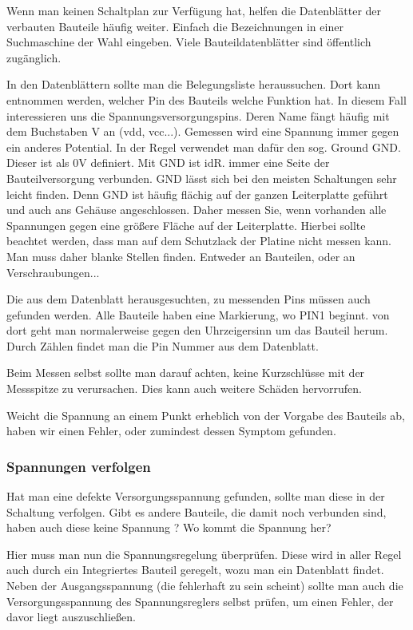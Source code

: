 Wenn man keinen Schaltplan zur Verfügung hat, helfen die Datenblätter der verbauten Bauteile häufig weiter.
Einfach die Bezeichnungen in einer Suchmaschine der Wahl eingeben.
Viele Bauteildatenblätter sind öffentlich zugänglich.

In den Datenblättern sollte man die Belegungsliste heraussuchen.
Dort kann entnommen werden, welcher Pin des Bauteils welche Funktion hat.
In diesem Fall interessieren uns die Spannungsversorgungspins.
Deren Name fängt häufig mit dem Buchstaben V an (vdd, vcc...). Gemessen wird eine Spannung immer gegen ein anderes Potential. In der Regel verwendet man dafür den sog. Ground GND.
Dieser ist als 0V definiert. Mit GND ist idR. immer eine Seite der Bauteilversorgung verbunden.
GND lässt sich bei den meisten Schaltungen sehr leicht finden. Denn GND ist häufig flächig auf der ganzen Leiterplatte geführt und auch ans Gehäuse angeschlossen.
Daher messen Sie, wenn vorhanden alle Spannungen gegen eine größere Fläche auf der Leiterplatte.
Hierbei sollte beachtet werden, dass man auf dem Schutzlack der Platine nicht messen kann.
Man muss daher blanke Stellen finden. Entweder an Bauteilen, oder an Verschraubungen...

Die aus dem Datenblatt herausgesuchten, zu messenden Pins müssen auch gefunden werden.
Alle Bauteile haben eine Markierung, wo PIN1 beginnt.
von dort geht man normalerweise gegen den Uhrzeigersinn um das Bauteil herum.
Durch Zählen findet man die Pin Nummer aus dem Datenblatt.

Beim Messen selbst sollte man darauf achten, keine Kurzschlüsse mit der Messspitze zu verursachen. Dies kann auch weitere Schäden hervorrufen.

Weicht die Spannung an einem Punkt erheblich von der Vorgabe des Bauteils ab, haben wir einen Fehler, oder zumindest dessen Symptom gefunden.

\subsubsection{Spannungen verfolgen}

Hat man eine defekte Versorgungsspannung gefunden, sollte man diese in der Schaltung verfolgen.
Gibt es andere Bauteile, die damit noch verbunden sind, haben auch diese keine Spannung ?
Wo kommt die Spannung her?

Hier muss man nun die Spannungsregelung überprüfen.
Diese wird in aller Regel auch durch ein Integriertes Bauteil geregelt, wozu man ein Datenblatt findet.
Neben der Ausgangsspannung (die fehlerhaft zu sein scheint) sollte man auch die Versorgungsspannung des Spannungsreglers selbst prüfen, um einen Fehler, der davor liegt auszuschließen.

